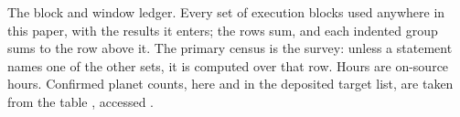 \begin{table}
\centering
\scriptsize
\caption{The block and window ledger. Every set of execution blocks used
anywhere in this paper, with the results it enters; the rows sum, and each
indented group sums to the row above it. The primary census is the survey:
unless a statement names one of the other sets, it is computed over that row.
Hours are on-source hours. Confirmed planet counts, here and in the deposited
target list, are taken from the \SfHostCatalogue{} \SfHostTable{} table
\citep{NEA2013}, accessed \SfHostDate.}
\label{tab:blockledger}

\end{table}


